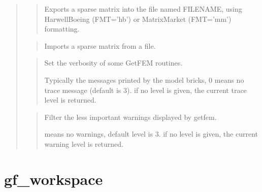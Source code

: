 \documentclass[a4paper,11pt,english]{sphinxmanual}
\begin{document}
\sphinxAtStartPar
{}
\begin{quote}

\sphinxAtStartPar
{}
\begin{quote}

\sphinxAtStartPar
Exports a sparse matrix into the file named FILENAME, using
Harwell\sphinxhyphen{}Boeing (FMT=’hb’) or Matrix\sphinxhyphen{}Market (FMT=’mm’) formatting.
\end{quote}

\sphinxAtStartPar
{}
\begin{quote}

\sphinxAtStartPar
Imports a sparse matrix from a file.
\end{quote}

\sphinxAtStartPar
{}
\begin{quote}

\sphinxAtStartPar
Set the verbosity of some GetFEM routines.

\sphinxAtStartPar
Typically the messages printed by the model bricks, 0 means no
trace message (default is 3). if no level is given,
the current trace level is returned.
\end{quote}

\sphinxAtStartPar
{}
\begin{quote}

\sphinxAtStartPar
Filter the less important warnings displayed by getfem.

 means no warnings, default level is 3. if no level is given,
the current warning level is returned.
\end{quote}
\end{quote}


\section{gf\_workspace}
\label{\detokenize{scilab/cmdref_gf_workspace:gf-workspace}}\label{\detokenize{scilab/cmdref_gf_workspace::doc}}
\sphinxAtStartPar
{}
\end{document}
